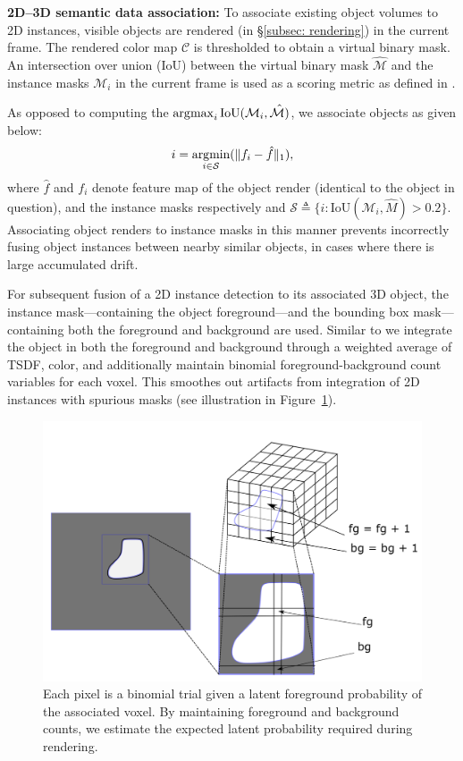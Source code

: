 \textbf{2D--3D semantic data association:}
To associate existing object volumes to 2D instances, visible objects are rendered (in \S\ref{subsec: rendering}) in the current frame. The rendered color map $\mathcal{C}$ is thresholded to obtain a virtual binary mask. An intersection over union (IoU) between the virtual binary mask $\hat{\mathcal{M}}$ and the instance masks $\mathcal{M}_i$ in the current frame is used as a scoring metric as defined in \cite{mccormacFusionVolumetricObjectLevel2018}.

As opposed to computing the $\operatorname*{\arg\!\max}_{i}{\text{IoU}(\mathcal{M}_i, \hat{\mathcal{M})}}$, we associate objects as given below:
\begin{align}
    i = \operatorname*{\arg\!\min}_{i \in \mathcal{S}} (\| f_i - \hat{f} \|_1),
\end{align}
where $\hat{f}$ and $f_i$ denote feature map of the object render (identical to the object in question), and the instance masks respectively and $\mathcal{S} \triangleq \{i : \text{IoU}(\mathcal{M}_i, \hat{M}) > 0.2\}$.
Associating object renders to instance masks in this manner prevents incorrectly fusing object instances between nearby similar objects, in cases where there is large accumulated drift.


For subsequent fusion of a 2D instance detection to its associated 3D object, the instance mask---containing the object foreground---and the bounding box mask---containing both the foreground and background are used. Similar to \cite{mccormacFusionVolumetricObjectLevel2018} we integrate the object in both the foreground and background through a weighted average of TSDF, color, and additionally maintain binomial foreground-background count variables for each voxel. This smoothes out artifacts from integration of 2D instances with spurious masks (see illustration in Figure~\ref{fig:object-integration}).

\begin{figure}[htpb]
    \centering
    \includegraphics[width=0.8\linewidth]{figs/object-integration.png}
    \caption{Each pixel is a binomial trial given a latent foreground probability of the associated voxel. By maintaining foreground and background counts, we estimate the expected latent probability required during rendering.}%
    \label{fig:object-integration}
\end{figure}

